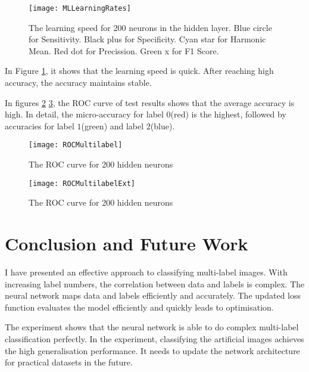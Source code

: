 \begin{figure}[htb]
\centering
\texttt{[image: MLLearningRates]}
\caption{\label{fig:MLLearningRates}The learning speed for 200 neurons in the hidden layer. Blue circle for Sensitivity. Black plus for Specificity. Cyan star for Harmonic Mean. Red dot for Precission. Green x for F1 Score.}
\end{figure}
In Figure \ref{fig:MLLearningRates}, it shows that the learning speed is quick. After reaching high accuracy, the accuracy maintains stable. 

In figures \ref{fig:MLROCCurve} \ref{fig:MLROCCurveExt}, the ROC curve of test results shows that the average accuracy is high. In detail, the micro-accuracy for label $0$(red) is the highest, followed by accuracies for label $1$(green) and label $2$(blue). 
\begin{figure}[htb]
\centering
\texttt{[image: ROCMultilabel]}
\caption{\label{fig:MLROCCurve}The ROC curve for 200 hidden neurons}
\end{figure}

\begin{figure}[htb]
\centering
\texttt{[image: ROCMultilabelExt]}
\caption{\label{fig:MLROCCurveExt}The ROC curve for 200 hidden neurons}
\end{figure}

\section{Conclusion and Future Work}

I have presented an effective approach to classifying multi-label images. With increasing label numbers, the correlation between data and labels is complex. The neural network maps data and labels efficiently and accurately. The updated loss function evaluates the model efficiently and quickly leads to optimisation.

The experiment shows that the neural network is able to do complex multi-label classification perfectly. In the experiment, classifying the artificial images achieves the high generalisation performance. It needs to update the network architecture for practical datasets in the future.












